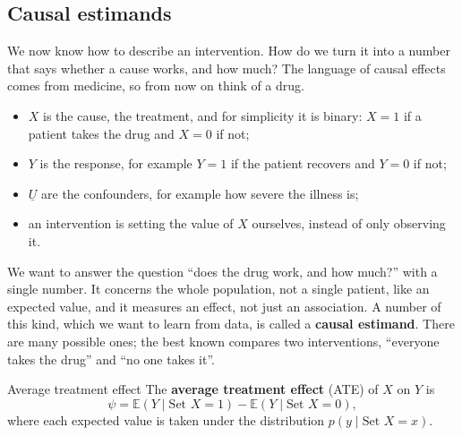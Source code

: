 \documentclass[a4paper,12pt,oneside]{report}
\begin{document}
\subsection{Causal estimands}\label{sec:causal-estimands}

We now know how to describe an intervention. How do we turn it into a
number that says whether a cause works, and how much? The language of
causal effects comes from medicine, so from now on think of a drug.

\noindent
\begin{minipage}[c]{.3\linewidth}
\centering
{}
\end{minipage}\hfill
\begin{minipage}[c]{.66\linewidth}
\begin{itemize}
\item $X$ is the cause, the treatment, and for simplicity it is binary:
$X=1$ if a patient takes the drug and $X=0$ if not;
\item $Y$ is the response, for example $Y=1$ if the patient recovers and
$Y=0$ if not;
\item $\underline{U}$ are the confounders, for example how severe the
illness is;
\item an intervention is setting the value of $X$ ourselves, instead of
only observing it.
\end{itemize}
\end{minipage}
\medskip

We want to answer the question ``does the drug work, and how much?'' with
a single number. It concerns the whole population, not a single patient,
like an expected value, and it measures an effect, not just an association.
A number of this kind, which we want to learn from data, is called a
\textbf{causal estimand}. There are many possible ones; the best known
compares two interventions, ``everyone takes the drug'' and ``no one takes
it''.

\begin{frameddefn}{Average treatment effect}\label{def:ate}
The \textbf{average treatment effect} (ATE) of $X$ on $Y$ is
\[
\psi=\mathbb{E}(Y\mid\text{Set }X=1)-\mathbb{E}(Y\mid\text{Set }X=0),
\]
where each expected value is taken under the distribution
$p(y\mid\text{Set }X=x)$.
\end{frameddefn}
\end{document}
